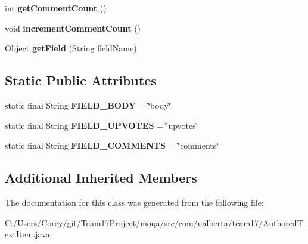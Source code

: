 \begin{DoxyCompactItemize}
\item 
\hypertarget{classcom_1_1ualberta_1_1team17_1_1_authored_text_item_ab253794e5b2640b105608e653c7f8ff6}{int {\bfseries get\+Comment\+Count} ()}\label{classcom_1_1ualberta_1_1team17_1_1_authored_text_item_ab253794e5b2640b105608e653c7f8ff6}

\item 
\hypertarget{classcom_1_1ualberta_1_1team17_1_1_authored_text_item_ad1f35f93ce891a83fa3e6785795ee908}{void {\bfseries increment\+Comment\+Count} ()}\label{classcom_1_1ualberta_1_1team17_1_1_authored_text_item_ad1f35f93ce891a83fa3e6785795ee908}

\item 
\hypertarget{classcom_1_1ualberta_1_1team17_1_1_authored_text_item_ae64e8aa68e329220610cb55e83b0a2ad}{Object {\bfseries get\+Field} (String field\+Name)}\label{classcom_1_1ualberta_1_1team17_1_1_authored_text_item_ae64e8aa68e329220610cb55e83b0a2ad}

\end{DoxyCompactItemize}
\subsection*{Static Public Attributes}
\begin{DoxyCompactItemize}
\item 
\hypertarget{classcom_1_1ualberta_1_1team17_1_1_authored_text_item_a5fb5cc76be4eb853f84903b2bda1b328}{static final String {\bfseries F\+I\+E\+L\+D\+\_\+\+B\+O\+D\+Y} = \char`\"{}body\char`\"{}}\label{classcom_1_1ualberta_1_1team17_1_1_authored_text_item_a5fb5cc76be4eb853f84903b2bda1b328}

\item 
\hypertarget{classcom_1_1ualberta_1_1team17_1_1_authored_text_item_afd753aeb9da1b3801fca58a8bb3629e6}{static final String {\bfseries F\+I\+E\+L\+D\+\_\+\+U\+P\+V\+O\+T\+E\+S} = \char`\"{}upvotes\char`\"{}}\label{classcom_1_1ualberta_1_1team17_1_1_authored_text_item_afd753aeb9da1b3801fca58a8bb3629e6}

\item 
\hypertarget{classcom_1_1ualberta_1_1team17_1_1_authored_text_item_a370271c9c5439dc6711843ee930e352d}{static final String {\bfseries F\+I\+E\+L\+D\+\_\+\+C\+O\+M\+M\+E\+N\+T\+S} = \char`\"{}comments\char`\"{}}\label{classcom_1_1ualberta_1_1team17_1_1_authored_text_item_a370271c9c5439dc6711843ee930e352d}

\end{DoxyCompactItemize}
\subsection*{Additional Inherited Members}


The documentation for this class was generated from the following file\+:\begin{DoxyCompactItemize}
\item 
C\+:/\+Users/\+Corey/git/\+Team17\+Project/moqa/src/com/ualberta/team17/Authored\+Text\+Item.\+java\end{DoxyCompactItemize}

